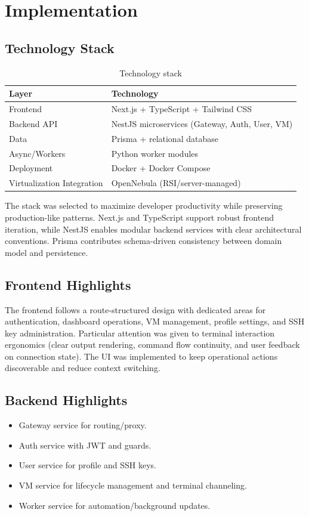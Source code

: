 \documentclass[12pt,a4paper]{report}
\begin{document}
\chapter{Implementation}
\section{Technology Stack}
\begin{table}[H]
\centering
\begin{tabular}{p{} p{}}
\toprule
\textbf{Layer} & \textbf{Technology} \\
\midrule
Frontend & Next.js + TypeScript + Tailwind CSS \\
Backend API & NestJS microservices (Gateway, Auth, User, VM) \\
Data & Prisma + relational database \\
Async/Workers & Python worker modules \\
Deployment & Docker + Docker Compose \\
Virtualization Integration & OpenNebula (RSI/server-managed) \\
\bottomrule
\end{tabular}
\caption{Technology stack}
\end{table}

The stack was selected to maximize developer productivity while preserving production-like patterns.
Next.js and TypeScript support robust frontend iteration, while NestJS enables modular backend services with clear architectural conventions.
Prisma contributes schema-driven consistency between domain model and persistence.

\section{Frontend Highlights}
The frontend follows a route-structured design with dedicated areas for authentication, dashboard operations, VM management, profile settings, and SSH key administration.
Particular attention was given to terminal interaction ergonomics (clear output rendering, command flow continuity, and user feedback on connection state).
The UI was implemented to keep operational actions discoverable and reduce context switching.

\section{Backend Highlights}
\begin{itemize}
    \item Gateway service for routing/proxy.
    \item Auth service with JWT and guards.
    \item User service for profile and SSH keys.
    \item VM service for lifecycle management and terminal channeling.
    \item Worker service for automation/background updates.
\end{itemize}
\end{document}
